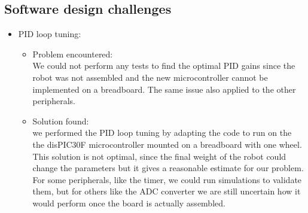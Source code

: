 
\subsection{Software design challenges}
\begin{itemize}
    \item PID loop tuning: 
     \begin{itemize}
      \item Problem encountered:\\
    We could not perform any tests to find the optimal PID gains since the robot was not assembled and the new microcontroller cannot be implemented on a breadboard. The same issue also applied to the other peripherals.
      \item Solution found:\\
    we performed the PID loop tuning by adapting the code to run on the the disPIC30F microcontroller mounted on a breadboard with one wheel. This solution is not optimal, since the final weight of the robot could change the parameters but it gives a reasonable estimate for our problem. For some peripherals, like the timer, we could run simulations to validate them, but for others like the ADC converter we are still uncertain how it would perform once the board is actually assembled.
        \end{itemize}
\end{itemize}

